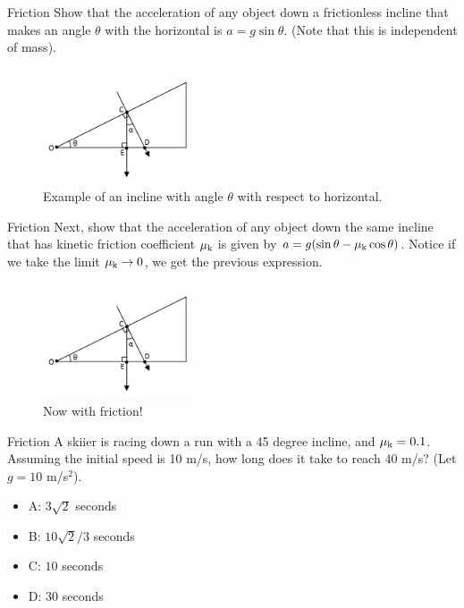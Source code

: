 \documentclass{beamer}
\begin{document}
\begin{frame}{Friction}
Show that the acceleration of any object down a frictionless incline that makes an angle $\theta$ with the horizontal is $a = g\sin\theta$.  (Note that this is independent of mass).
\begin{figure}
\centering
\includegraphics[width=0.4\textwidth]{figures/incline.png}
\caption{\label{fig:incline} Example of an incline with angle $\theta$ with respect to horizontal.}
\end{figure}
\end{frame}

\begin{frame}{Friction}
Next, show that the acceleration of any object down the same incline \alert{that has kinetic friction coefficient} $\mu_{\rm k} $ is given by $a = g(\sin\theta-\mu_{\rm k}\cos\theta)$.  Notice if we take the limit $\mu_{\rm k} \to 0$, we get the previous expression.
\begin{figure}
\centering
\includegraphics[width=0.4\textwidth]{figures/incline.png}
\caption{\label{fig:incline2} Now with friction!}
\end{figure}
\end{frame}

\begin{frame}{Friction}
A skiier is racing down a run with a 45 degree incline, and $\mu_{\rm k} = 0.1$.  Assuming the initial speed is 10 m/s, how long does it take to reach 40 m/s? (Let $g = 10$ m/s$^2$).
\begin{itemize}
\item A: $3\sqrt{2}$ seconds
\item B: $10\sqrt{2}/3$ seconds
\item C: $10$ seconds
\item D: $30$ seconds
\end{itemize}
\end{frame}
\end{document}
